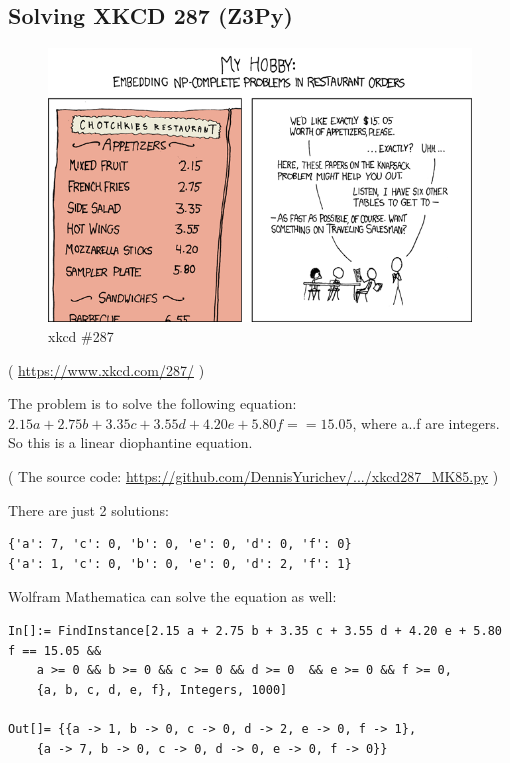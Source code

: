 \subsection{Solving XKCD 287 (Z3Py)}
\label{XkcdILP}

\begin{figure}[H]
\centering
\includegraphics[scale=7]{equations/xkcd287/np_complete.png}
\caption{xkcd \#287}
\end{figure}

( \url{https://www.xkcd.com/287/} )

The problem is to solve the following equation:
$2.15a + 2.75b + 3.35c + 3.55d + 4.20e + 5.80f == 15.05$,
where a..f are integers.
So this is a linear diophantine equation.



( The source code: \url{https://github.com/DennisYurichev/.../xkcd287_MK85.py} )

There are just 2 solutions:

\begin{lstlisting}
{'a': 7, 'c': 0, 'b': 0, 'e': 0, 'd': 0, 'f': 0}
{'a': 1, 'c': 0, 'b': 0, 'e': 0, 'd': 2, 'f': 1}
\end{lstlisting}

Wolfram Mathematica can solve the equation as well:

\begin{lstlisting}
In[]:= FindInstance[2.15 a + 2.75 b + 3.35 c + 3.55 d + 4.20 e + 5.80 f == 15.05 && 
	a >= 0 && b >= 0 && c >= 0 && d >= 0  && e >= 0 && f >= 0, 
	{a, b, c, d, e, f}, Integers, 1000]

Out[]= {{a -> 1, b -> 0, c -> 0, d -> 2, e -> 0, f -> 1},
	{a -> 7, b -> 0, c -> 0, d -> 0, e -> 0, f -> 0}}
\end{lstlisting}

